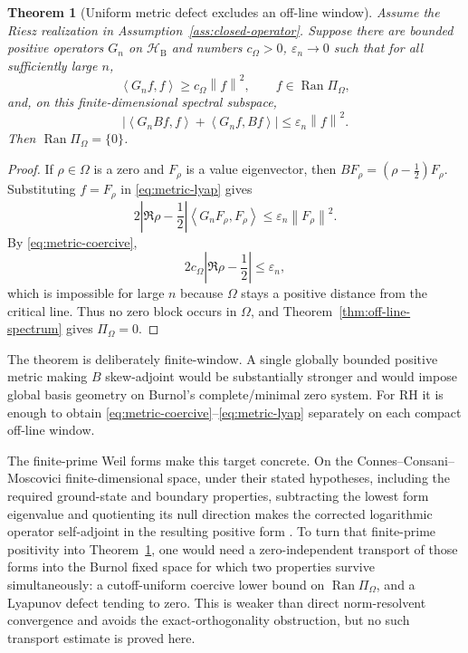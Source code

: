 \documentclass[11pt]{article}
\newtheorem{theorem}{Theorem}[section]
\theoremstyle{remark}
\newcommand{\norm}[1]{\left\lVert #1\right\rVert}
\newcommand{\ip}[2]{\left\langle #1,#2\right\rangle}
\begin{document}
\begin{theorem}[Uniform metric defect excludes an off-line window]\label{thm:metric-window}
Assume the Riesz realization in Assumption~\ref{ass:closed-operator}. Suppose there are bounded positive operators $G_n$ on $\mathscr H_{\mathrm B}$ and numbers $c_\Omega>0$, $\varepsilon_n\to0$ such that for all sufficiently large $n$,
\begin{equation}\label{eq:metric-coercive}
 \ip{G_nf}{f}\ge c_\Omega\norm{f}^2,
 \qquad f\in\operatorname{Ran}\Pi_\Omega,
\end{equation}
and, on this finite-dimensional spectral subspace,
\begin{equation}\label{eq:metric-lyap}
 \left|\ip{G_nBf}{f}+\ip{G_nf}{Bf}\right|
 \le \varepsilon_n\norm{f}^2.
\end{equation}
Then $\operatorname{Ran}\Pi_\Omega=\{0\}$.
\end{theorem}
\begin{proof}
If $\rho\in\Omega$ is a zero and $F_\rho$ is a value eigenvector, then $BF_\rho=(\rho-\frac12)F_\rho$.  Substituting $f=F_\rho$ in \eqref{eq:metric-lyap} gives
\[
 2\left|\Re\rho-\frac12\right|\ip{G_nF_\rho}{F_\rho}
 \le\varepsilon_n\norm{F_\rho}^2.
\]
By \eqref{eq:metric-coercive},
\[
 2c_\Omega\left|\Re\rho-\frac12\right|\le\varepsilon_n,
\]
which is impossible for large $n$ because $\Omega$ stays a positive distance from the critical line.  Thus no zero block occurs in $\Omega$, and Theorem~\ref{thm:off-line-spectrum} gives $\Pi_\Omega=0$.
\end{proof}

The theorem is deliberately finite-window.  A single globally bounded positive metric making $B$ skew-adjoint would be substantially stronger and would impose global basis geometry on Burnol's complete/minimal zero system.  For RH it is enough to obtain \eqref{eq:metric-coercive}--\eqref{eq:metric-lyap} separately on each compact off-line window.

The finite-prime Weil forms make this target concrete.  On the Connes--Consani--Moscovici finite-dimensional space, under their stated hypotheses, including the required ground-state and boundary properties, subtracting the lowest form eigenvalue and quotienting its null direction makes the corrected logarithmic operator self-adjoint in the resulting positive form \cite{ConnesConsaniMoscovici2025}.  To turn that finite-prime positivity into Theorem~\ref{thm:metric-window}, one would need a zero-independent transport of those forms into the Burnol fixed space for which two properties survive simultaneously: a cutoff-uniform coercive lower bound on $\operatorname{Ran}\Pi_\Omega$, and a Lyapunov defect tending to zero.  This is weaker than direct norm-resolvent convergence and avoids the exact-orthogonality obstruction, but no such transport estimate is proved here.
\end{document}
